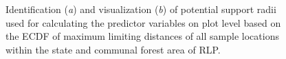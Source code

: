 \begin{figure}[h]
	\begin{subfigure}[t]{0.5\textwidth}
		\centering
		\caption{} \label{fig:sf1}
	\end{subfigure}
	\begin{subfigure}[t]{0.5\textwidth}
		\centering
		\caption{} \label{fig:sf2}
	\end{subfigure}
     \caption{Identification (\textit{a}) and visualization (\textit{b}) of potential support radii used for calculating the predictor variables on plot level based on the ECDF of maximum limiting distances of all \bwi{} sample locations within the state and communal forest area of RLP.}
      \label{fig:tspec_supps}
\end{figure}

